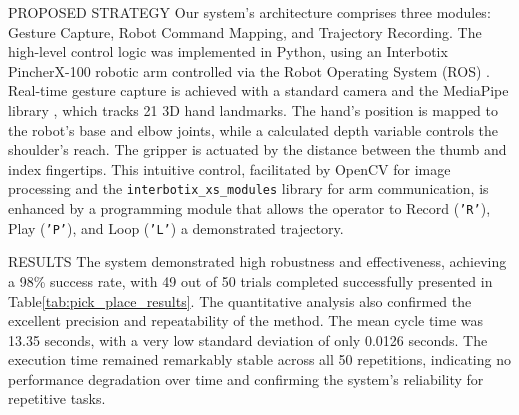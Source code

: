 \documentclass[%
  final,%
  english,%
  english,%
]{beamer}
\begin{document}
\begin{frame}[t, fragile = singleslide]
\begin{columns}[t, onlytextwidth]
\begin{column}{.49\textwidth}
\begin{block}{PROPOSED STRATEGY}
Our system's architecture comprises three modules: Gesture Capture, Robot Command Mapping, and Trajectory Recording. The high-level control logic was implemented in Python, using an Interbotix PincherX-100 robotic arm controlled via the Robot Operating System (ROS) \cite{ros}. Real-time gesture capture is achieved with a standard camera and the MediaPipe library \cite{mediapipe}, which tracks 21 3D hand landmarks. The hand's position is mapped to the robot's base and elbow joints, while a calculated depth variable controls the shoulder's reach. The gripper is actuated by the distance between the thumb and index fingertips. This intuitive control, facilitated by OpenCV \cite{opencv_library} for image processing and the \texttt{interbotix\_xs\_modules} library for arm communication, is enhanced by a programming module that allows the operator to Record (\texttt{'R'}), Play (\texttt{'P'}), and Loop (\texttt{'L'}) a demonstrated trajectory.

\end{block}
%
\begin{block}{RESULTS}
The system demonstrated high robustness and effectiveness, achieving a 98\% success rate, with 49 out of 50 trials completed successfully presented in Table\ref{tab:pick_place_results}. The quantitative analysis also confirmed the excellent precision and repeatability of the method. The mean cycle time was 13.35 seconds, with a very low standard deviation of only 0.0126 seconds. The execution time remained remarkably stable across all 50 repetitions, indicating no performance degradation over time and confirming the system's reliability for repetitive tasks.



\end{block}
\end{column}
\end{columns}
\end{frame}
\end{document}
